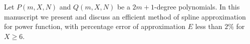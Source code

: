 ﻿Let $P(m, X, N)$ and $Q(m, X, N)$ be a $2m+1$-degree polynomials.
In this manuscript we present and discuss an efficient method of spline approximation
for power function, with percentage error of approximation $E$ less than $2\%$ for $X \geq 6$.
